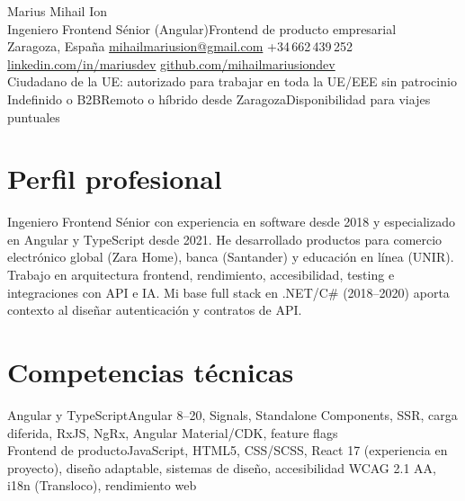 \documentclass[10pt,a4paper]{article}
\newcommand{\skill}[2]{%
  {\normalsize\latosemibold #1\normalfont\enspace\color{mid}#2}\\[3pt]
}
\begin{document}
\begin{center}
  {\fontsize{20}{24}\selectfont\latosemibold{}\color{dark} Marius Mihail Ion}\\[4pt]
  {\latomedium\color{mid}\small Ingeniero Frontend Sénior (Angular)\enspace\textbar\enspace Frontend de producto empresarial}\\[4pt]
  {\latolight\footnotesize\color{light}
    Zaragoza, España\enspace\textbar\enspace
    \href{mailto:mihailmariusion@gmail.com}{mihailmariusion@gmail.com}\enspace\textbar\enspace
    +34\,662\,439\,252\enspace\textbar\enspace
    \href{https://linkedin.com/in/mariusdev}{linkedin.com/in/mariusdev}\enspace\textbar\enspace
    \href{https://github.com/mihailmariusiondev}{github.com/mihailmariusiondev}
  }\\[3pt]
  {\small\latosemibold\color{dark} Ciudadano de la UE: autorizado para trabajar en toda la UE/EEE sin patrocinio}\\[1pt]
  {\latolight\footnotesize\color{light} Indefinido o B2B\enspace\textbar\enspace Remoto o híbrido desde Zaragoza\enspace\textbar\enspace Disponibilidad para viajes puntuales}
\end{center}
\vspace{2pt}

\section{Perfil profesional}
{\normalsize\color{dark}
Ingeniero Frontend Sénior con experiencia en software desde 2018 y especializado en Angular y TypeScript desde 2021. He desarrollado productos para comercio electrónico global (Zara Home), banca (Santander) y educación en línea (UNIR). Trabajo en arquitectura frontend, rendimiento, accesibilidad, testing e integraciones con API e IA. Mi base full stack en .NET/C\# (2018--2020) aporta contexto al diseñar autenticación y contratos de API.
}

\section{Competencias técnicas}

\skill{Angular y TypeScript}{Angular 8--20, Signals, Standalone Components, SSR, carga diferida, RxJS, NgRx, Angular Material/CDK, feature flags}

\skill{Frontend de producto}{JavaScript, HTML5, CSS/SCSS, React 17 (experiencia en proyecto), diseño adaptable, sistemas de diseño, accesibilidad WCAG 2.1 AA, i18n (Transloco), rendimiento web}
\end{document}
